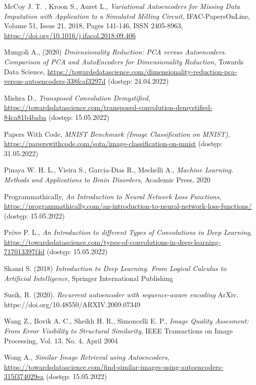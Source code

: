 \documentclass[12pt]{mwbk}
\theoremstyle{plain}
\theoremstyle{definition}
\theoremstyle{remark}
\begin{document}
\begin{thebibliography}{99}
 McCoy J. T. , Kroon S.,  Auret L.,
\emph{Variational Autoencoders for Missing Data Imputation with Application to a Simulated Milling Circuit},
IFAC-PapersOnLine,
 Volume 51, Issue 21,
 2018,
 Pages 141-146,
 ISSN 2405-8963, \url{https://doi.org/10.1016/j.ifacol.2018.09.406}

 Mungoli A., (2020) \emph{Dmiensionality Reduction: PCA versus Autoencoders. Comparison of PCA and AutoEncoders for Dimensionality Reduction}, Towards Data Science, \url{https://towardsdatascience.com/dimensionality-reduction-pca-versus-autoencoders-338fcaf3297d} (dostęp: 24.04.2022)

 Mishra D., \emph{Transposed Convolution Demystified}, \url{https://towardsdatascience.com/transposed-convolution-demystified-84ca81b4baba} (dostęp: 15.05.2022)

 Papers With Code, \emph{MNIST Benchmark (Image Classification on MNIST)}, \url{https://paperswithcode.com/sota/image-classification-on-mnist} (dostęp: 31.05.2022)

 Pinaya W. H. L., Vieira S., Garcia-Dias R., Mechelli A., \emph{Machine Learning. Methods and Applications to Brain Disorders}, Academic Press,
2020

 Programmathically, \emph{An Introduction to Neural Network Loss Functions}, \url{https://programmathically.com/an-introduction-to-neural-network-loss-functions/} (dostęp: 15.05.2022)

 Pröve P. L., \emph{An Introduction to different Types of Convolutions in Deep Learning}, \url{https://towardsdatascience.com/types-of-convolutions-in-deep-learning-717013397f4d} (dostęp: 15.05.2022)

 Skansi S. (2018) \emph{Introduction to Deep Learning. From Logical Calculus to Artificial Intelligence}, Springer International Publishing

 Susik, R. (2020). \emph{Recurrent autoencoder with sequence-aware encoding} ArXiv. https://doi.org/10.48550/ARXIV.2009.07349 

 Wang Z., Bovik A. C., Sheikh H. R., Simoncelli E. P., \emph{Image Quality Assesment: From Error Visibility to Structural Similarity}, IEEE Transactions on Image Processing, Vol. 13, No. 4, April 2004

 Wong A., \emph{Similar Image Retrieval using Autoencoders}, \url{https://towardsdatascience.com/find-similar-images-using-autoencoders-315f374029ea} (dostęp: 15.05.2022)

\end{thebibliography}
\end{document}
